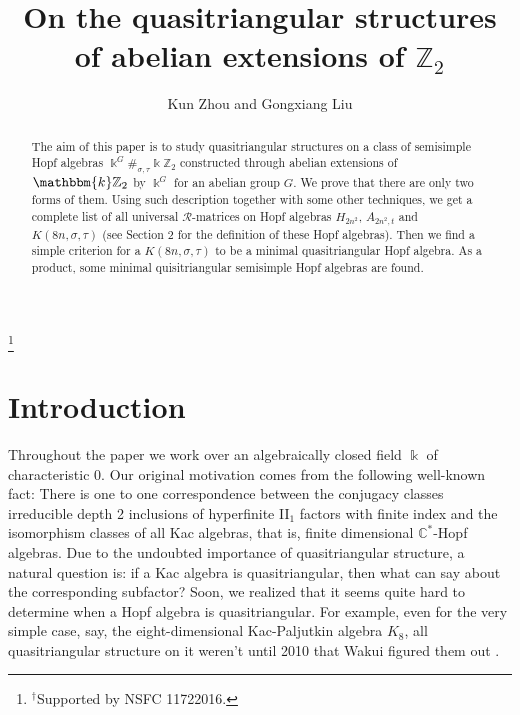 \documentclass[a4paper,11pt]{amsart}
\def \Z{\mathbb{Z}}
\def \k{\mathbbm{k}}
\def \Z{\mathbb{Z}}
\numberwithin{equation}{section}
\begin{document}
\title{On the quasitriangular structures of abelian extensions of $\mathbb{Z}_{2}$}
\thanks{$^\dag$Supported by NSFC 11722016.}



\author{Kun Zhou and Gongxiang Liu}
\address{Department of Mathematics, Nanjing University, Nanjing 210093, China} 
\date{}
\maketitle
\begin{abstract}  The aim of this paper is to study quasitriangular structures on a class of semisimple Hopf algebras $\Bbbk^G\#_{\sigma,\tau}\Bbbk \mathbb{Z}_{2}$ constructed through abelian extensions of $\k\Z_2$ by $\Bbbk^G$ for an abelian group $G.$ We prove that there are only two forms of them. Using such description together with some other techniques, we get a complete list of all universal $\mathcal{R}$-matrices on Hopf algebras $H_{2n^2}$, $A_{2n^2,t}$ and $K(8n,\sigma,\tau)$ (see Section 2 for the definition of these Hopf algebras). Then we find a simple criterion for a $K(8n,\sigma,\tau)$ to be a minimal quasitriangular Hopf algebra. As a product, some minimal quisitriangular semisimple Hopf algebras are found.
\end{abstract}

\section{Introduction}
Throughout the paper we work over an algebraically closed field $\Bbbk$ of characteristic 0. Our original motivation comes from the following well-known fact: There is one to one correspondence between the conjugacy classes irreducible depth 2 inclusions of hyperfinite II$_1$ factors with finite index and the isomorphism classes of all Kac algebras, that is, finite dimensional $\mathbb{C}^\ast$-Hopf algebras. Due to the undoubted importance of quasitriangular structure, a natural question is: if a Kac algebra is quasitriangular, then what can say about the corresponding subfactor? Soon, we realized that it seems quite hard to determine when a Hopf algebra is quasitriangular. For example, even for the very simple case, say, the eight-dimensional Kac-Paljutkin algebra $K_8$, all quasitriangular structure on it weren't until 2010 that Wakui figured them out \cite{W}.
\end{document}
